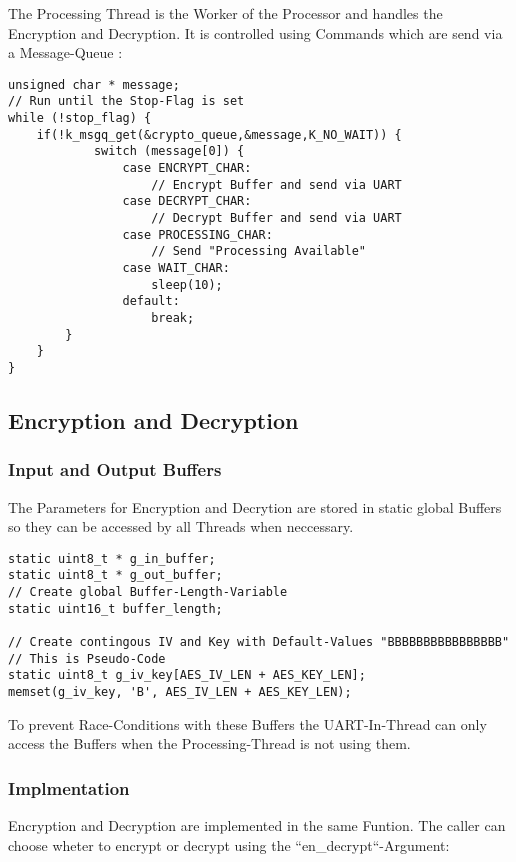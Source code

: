 The Processing Thread is the Worker of the Processor and handles the
Encryption and Decryption.
It is controlled using Commands which are send via a Message-Queue :

\begin{lstlisting}[style=CStyle,caption=Processing Thread Pseudo-Code]
unsigned char * message;
// Run until the Stop-Flag is set
while (!stop_flag) {
	if(!k_msgq_get(&crypto_queue,&message,K_NO_WAIT)) {
			switch (message[0]) {
				case ENCRYPT_CHAR:
					// Encrypt Buffer and send via UART
				case DECRYPT_CHAR:
					// Decrypt Buffer and send via UART
				case PROCESSING_CHAR:
					// Send "Processing Available"
				case WAIT_CHAR:
					sleep(10);
				default:
					break;
		}
	}
}
\end{lstlisting}

\subsection{Encryption and Decryption}

\subsubsection{Input and Output Buffers}

The Parameters for Encryption and Decrytion are stored in static global
Buffers so they can be accessed by all Threads when neccessary.

\begin{lstlisting}[style=CStyle,caption=Global Buffers for Encryption and Decryption]
static uint8_t * g_in_buffer;
static uint8_t * g_out_buffer;
// Create global Buffer-Length-Variable
static uint16_t buffer_length;

// Create contingous IV and Key with Default-Values "BBBBBBBBBBBBBBBB"
// This is Pseudo-Code
static uint8_t g_iv_key[AES_IV_LEN + AES_KEY_LEN];
memset(g_iv_key, 'B', AES_IV_LEN + AES_KEY_LEN);
\end{lstlisting}

To prevent Race-Conditions with these Buffers the UART-In-Thread can only
access the Buffers when the Processing-Thread is not using them.

\pagebreak

\subsubsection{Implmentation}

Encryption and Decryption are implemented in the same Funtion.
The caller can choose wheter to encrypt or decrypt using the
``en\_decrypt``-Argument:

